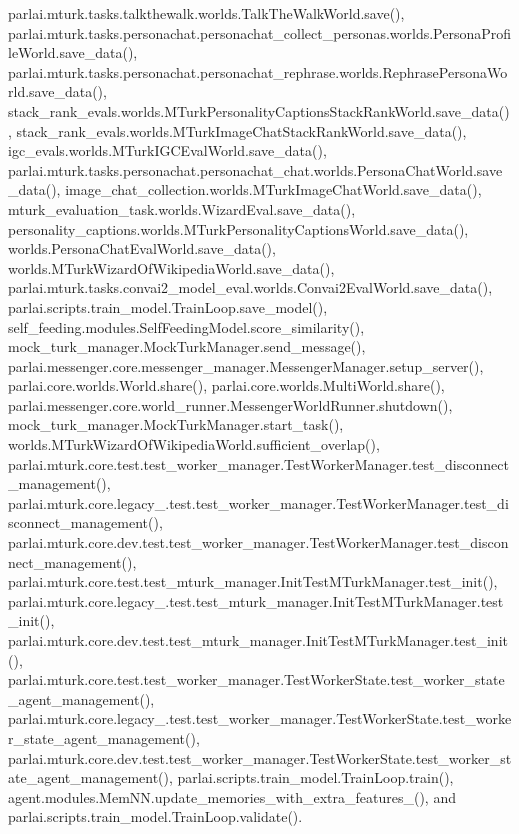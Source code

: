 parlai.\+mturk.\+tasks.\+talkthewalk.\+worlds.\+Talk\+The\+Walk\+World.\+save(), parlai.\+mturk.\+tasks.\+personachat.\+personachat\+\_\+collect\+\_\+personas.\+worlds.\+Persona\+Profile\+World.\+save\+\_\+data(), parlai.\+mturk.\+tasks.\+personachat.\+personachat\+\_\+rephrase.\+worlds.\+Rephrase\+Persona\+World.\+save\+\_\+data(), stack\+\_\+rank\+\_\+evals.\+worlds.\+M\+Turk\+Personality\+Captions\+Stack\+Rank\+World.\+save\+\_\+data(), stack\+\_\+rank\+\_\+evals.\+worlds.\+M\+Turk\+Image\+Chat\+Stack\+Rank\+World.\+save\+\_\+data(), igc\+\_\+evals.\+worlds.\+M\+Turk\+I\+G\+C\+Eval\+World.\+save\+\_\+data(), parlai.\+mturk.\+tasks.\+personachat.\+personachat\+\_\+chat.\+worlds.\+Persona\+Chat\+World.\+save\+\_\+data(), image\+\_\+chat\+\_\+collection.\+worlds.\+M\+Turk\+Image\+Chat\+World.\+save\+\_\+data(), mturk\+\_\+evaluation\+\_\+task.\+worlds.\+Wizard\+Eval.\+save\+\_\+data(), personality\+\_\+captions.\+worlds.\+M\+Turk\+Personality\+Captions\+World.\+save\+\_\+data(), worlds.\+Persona\+Chat\+Eval\+World.\+save\+\_\+data(), worlds.\+M\+Turk\+Wizard\+Of\+Wikipedia\+World.\+save\+\_\+data(), parlai.\+mturk.\+tasks.\+convai2\+\_\+model\+\_\+eval.\+worlds.\+Convai2\+Eval\+World.\+save\+\_\+data(), parlai.\+scripts.\+train\+\_\+model.\+Train\+Loop.\+save\+\_\+model(), self\+\_\+feeding.\+modules.\+Self\+Feeding\+Model.\+score\+\_\+similarity(), mock\+\_\+turk\+\_\+manager.\+Mock\+Turk\+Manager.\+send\+\_\+message(), parlai.\+messenger.\+core.\+messenger\+\_\+manager.\+Messenger\+Manager.\+setup\+\_\+server(), parlai.\+core.\+worlds.\+World.\+share(), parlai.\+core.\+worlds.\+Multi\+World.\+share(), parlai.\+messenger.\+core.\+world\+\_\+runner.\+Messenger\+World\+Runner.\+shutdown(), mock\+\_\+turk\+\_\+manager.\+Mock\+Turk\+Manager.\+start\+\_\+task(), worlds.\+M\+Turk\+Wizard\+Of\+Wikipedia\+World.\+sufficient\+\_\+overlap(), parlai.\+mturk.\+core.\+test.\+test\+\_\+worker\+\_\+manager.\+Test\+Worker\+Manager.\+test\+\_\+disconnect\+\_\+management(), parlai.\+mturk.\+core.\+legacy\+\_.\+test.\+test\+\_\+worker\+\_\+manager.\+Test\+Worker\+Manager.\+test\+\_\+disconnect\+\_\+management(), parlai.\+mturk.\+core.\+dev.\+test.\+test\+\_\+worker\+\_\+manager.\+Test\+Worker\+Manager.\+test\+\_\+disconnect\+\_\+management(), parlai.\+mturk.\+core.\+test.\+test\+\_\+mturk\+\_\+manager.\+Init\+Test\+M\+Turk\+Manager.\+test\+\_\+init(), parlai.\+mturk.\+core.\+legacy\+\_.\+test.\+test\+\_\+mturk\+\_\+manager.\+Init\+Test\+M\+Turk\+Manager.\+test\+\_\+init(), parlai.\+mturk.\+core.\+dev.\+test.\+test\+\_\+mturk\+\_\+manager.\+Init\+Test\+M\+Turk\+Manager.\+test\+\_\+init(), parlai.\+mturk.\+core.\+test.\+test\+\_\+worker\+\_\+manager.\+Test\+Worker\+State.\+test\+\_\+worker\+\_\+state\+\_\+agent\+\_\+management(), parlai.\+mturk.\+core.\+legacy\+\_.\+test.\+test\+\_\+worker\+\_\+manager.\+Test\+Worker\+State.\+test\+\_\+worker\+\_\+state\+\_\+agent\+\_\+management(), parlai.\+mturk.\+core.\+dev.\+test.\+test\+\_\+worker\+\_\+manager.\+Test\+Worker\+State.\+test\+\_\+worker\+\_\+state\+\_\+agent\+\_\+management(), parlai.\+scripts.\+train\+\_\+model.\+Train\+Loop.\+train(), agent.\+modules.\+Mem\+N\+N.\+update\+\_\+memories\+\_\+with\+\_\+extra\+\_\+features\+\_\+(), and parlai.\+scripts.\+train\+\_\+model.\+Train\+Loop.\+validate().

